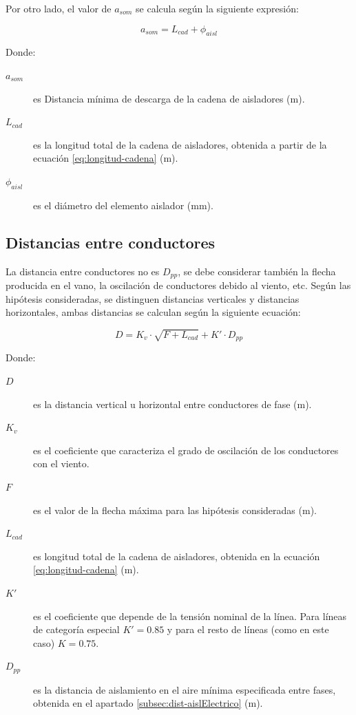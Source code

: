 Por otro lado, el valor de $a_{som}$ se calcula según la siguiente expresión:

\begin{equation}
    a_{som}=L_{cad}+\phi_{aisl}
    \label{eq:distancia-descarga-cadena}
\end{equation}

Donde:
\begin{description}
    \item[$a_{som}$] es Distancia mínima de descarga de la cadena de aisladores (\si{\meter}).
    \item[$L_{cad}$] es la longitud total de la cadena de aisladores, obtenida a partir de la ecuación \ref{eq:longitud-cadena} (\si{\meter}).
    \item[$\phi_{aisl}$] es el diámetro del elemento aislador (\si{\milli\meter}).
\end{description}
\subsection{Distancias entre conductores}
\label{subsec:dist-conductores}
La distancia entre conductores no es $D_{pp}$, se debe considerar también la flecha producida en el vano, la oscilación de conductores debido al viento, etc. Según las hipótesis consideradas, se distinguen distancias verticales y distancias horizontales, ambas distancias se calculan según la siguiente ecuación:

\begin{equation}
    D=K_v\cdot \sqrt{F+L_{cad}}+K'\cdot D_{pp}
    \label{eq:distancia-fasefase}
\end{equation}

Donde:
\begin{description}
    \item[$D$] es la distancia vertical u horizontal entre conductores de fase (\si{\meter}).
    \item[$K_v$] es el coeficiente que caracteriza el grado de oscilación de los conductores con el viento.
    \item[$F$] es el valor de la flecha máxima para las hipótesis consideradas (\si{\meter}).
    \item[$L_{cad}$] es longitud total de la cadena de aisladores, obtenida en la ecuación \ref{eq:longitud-cadena} (\si{\meter}).
    \item[$K'$] es el coeficiente que depende de la tensión nominal de la línea. Para líneas de categoría especial $K'=0.85$ y para el resto de líneas (como en este caso) $K=0.75$.
    \item[$D_{pp}$] es la distancia de aislamiento en el aire mínima especificada entre fases, obtenida en el apartado \ref{subsec:dist-aislElectrico} (\si{\meter}).
\end{description}

